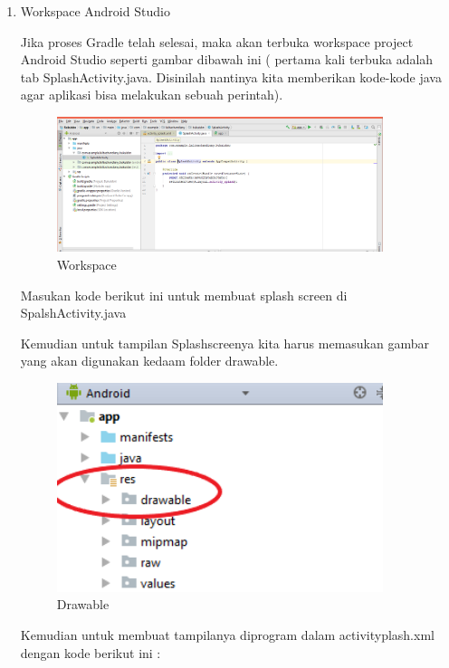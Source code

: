 \begin{enumerate}
    \item Workspace Android Studio
    \par Jika proses Gradle telah selesai, maka akan terbuka workspace project Android Studio seperti gambar dibawah ini ( pertama kali terbuka adalah tab SplashActivity.java. Disinilah nantinya kita memberikan kode-kode java agar aplikasi bisa melakukan sebuah perintah).
        \begin{figure}[H]
        \centering
        \includegraphics[width=0.9\textwidth]{figures/android30.png}
        \caption{Workspace}
        \label{print}
        \end{figure}
    
    \par Masukan kode berikut ini untuk membuat splash screen di SpalshActivity.java


\par Kemudian untuk tampilan Splashscreenya kita harus memasukan gambar yang akan digunakan kedaam folder drawable.
  \begin{figure}[H]
        \centering
        \includegraphics[width=0.9\textwidth]{figures/android31.png}
        \caption{Drawable}
        \label{print}
        \end{figure}
\par Kemudian untuk membuat tampilanya diprogram dalam activityplash.xml dengan kode berikut ini :

\end{enumerate}

